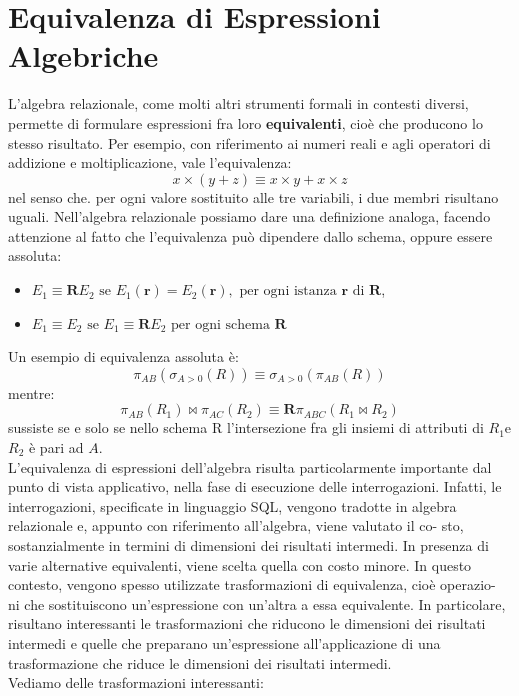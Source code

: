 \documentclass[a4paper,12pt, oneside]{book}
\begin{document}
\section{Equivalenza di Espressioni Algebriche}
L'algebra relazionale, come molti altri strumenti formali in contesti diversi, permette
di formulare espressioni fra loro \textbf{equivalenti}, cioè che producono lo stesso
risultato. Per esempio, con riferimento ai numeri reali e agli operatori di addizione
e moltiplicazione, vale l'equivalenza:
\[x \times(y+z) \equiv x \times y+x \times z\]
nel senso che. per ogni valore sostituito alle tre variabili, i due membri risultano
uguali. Nell'algebra relazionale possiamo dare una definizione analoga, facendo
attenzione al fatto che l'equivalenza può dipendere dallo schema, oppure essere
assoluta:
\begin{itemize}
\item $E_{1} \equiv \mathbf{R} E_{2} \text { se } E_{1}(\mathbf{r})=E_{2}(\mathbf{r}), \text { per ogni istanza } \mathbf{r} \text { di } \mathbf{R}$, 
\item $E_{1} \equiv E_{2} \text { se } E_{1} \equiv \mathbf{R} E_{2} \text { per ogni schema } \mathbf{R}$  
\end{itemize}
Un esempio di equivalenza assoluta è:
\[\pi_{A B}\left(\sigma_{A>0}(R)\right) \equiv \sigma_{A>0}\left(\pi_{A B}(R)\right)\]
mentre:
\[\pi_{AB}(R_1)\Join\pi_{AC}(R_2)\equiv \mathbf{R}\pi_{ABC}(R_1\Join R_2)\]
sussiste se e solo se nello schema R l'intersezione fra gli insiemi di attributi di $R_1$e $R_2$ è pari ad $A$.\\
L'equivalenza di espressioni dell'algebra risulta particolarmente importante
dal punto di vista applicativo, nella fase di esecuzione delle interrogazioni. Infatti,
le interrogazioni, specificate in linguaggio SQL, vengono tradotte in
algebra relazionale e, appunto con riferimento all'algebra, viene valutato il co-
sto, sostanzialmente in termini di dimensioni dei risultati intermedi. In presenza
di varie alternative equivalenti, viene scelta quella con costo minore. In questo
contesto, vengono spesso utilizzate trasformazioni di equivalenza, cioè operazio-
ni che sostituiscono un'espressione con un'altra a essa equivalente. In particolare,
risultano interessanti le trasformazioni che riducono le dimensioni dei risultati
intermedi e quelle che preparano un'espressione all'applicazione di una trasformazione
che riduce le dimensioni dei risultati intermedi.\\
Vediamo delle trasformazioni interessanti: 
\end{document}
